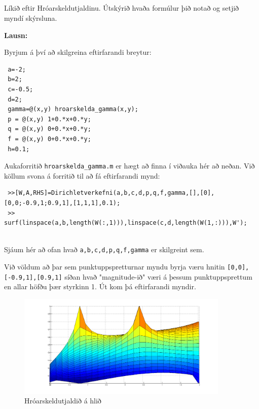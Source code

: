 \documentclass[11pt,a4paper,titlepage]{article}
\begin{document}
\newpage
 
 \subsection{}
 Líkið eftir Hróarskeldutjaldinu. Útskýrið hvaða formúlur þið notað og setjið myndí skýrsluna. 
 
 \par
 \textbf{Lausn:}\par
 
 Byrjum á því að skilgreina eftirfarandi breytur:
 \begin{verbatim}
 a=-2;
 b=2;
 c=-0.5;
 d=2;
 gamma=@(x,y) hroarskelda_gamma(x,y);
 p = @(x,y) 1+0.*x+0.*y;
 q = @(x,y) 0+0.*x+0.*y;
 f = @(x,y) 0+0.*x+0.*y;
 h=0.1;
 \end{verbatim}
 Aukaforritið   \verb|hroarskelda_gamma.m| er hægt að finna í viðauka hér að neðan.  Við köllum svona á forritið til að fá eftirfarandi mynd:
 \begin{verbatim}
 >>[W,A,RHS]=Dirichletverkefni(a,b,c,d,p,q,f,gamma,[],[0],[0,0;-0.9,1;0.9,1],[1,1,1],0.1);
 >> surf(linspace(a,b,length(W(:,1))),linspace(c,d,length(W(1,:))),W');
 
 \end{verbatim}
 Sjáum hér að ofan hvað  \verb|a,b,c,d,p,q,f,gamma| er skilgreint sem. 
 
 Við völdum að þar sem punktuppspretturnar myndu byrja væru hnitin  \verb|[0,0],[-0.9,1],[0.9,1]|  síðan hvað "magnitude-ið" væri á þessum punktuppsprettum en allar höfðu þær styrkinn 1. Út kom þá eftirfarandi myndir. 
 
 \begin{figure}[h!]
     \centering
     \includegraphics[width=0.9\textwidth]{hroarskelda_hlid.png}
     \caption{Hróarskeldutjaldið á hlið}
     \label{fig:awesome_image9}
 \end{figure}
 
\end{document}
